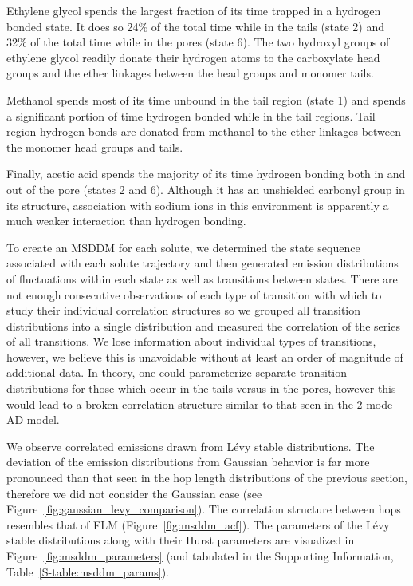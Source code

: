 \documentclass{article}
\begin{document}
  Ethylene glycol spends the largest fraction of its time trapped in a hydrogen
  bonded state. It does so 24\% of the total time while in the tails (state 2)
  and 32\% of the total time while in the pores (state 6). The two hydroxyl groups 
  of ethylene glycol readily donate their hydrogen atoms to the carboxylate
  head groups and the ether linkages between the head groups and monomer tails. 
  
  Methanol spends most of its time unbound in the tail region (state 1) and spends a 
  significant portion of time hydrogen bonded while in the tail regions.
  Tail region hydrogen bonds are donated from methanol to the ether linkages between
  the monomer head groups and tails.
  
  Finally, acetic acid spends the majority of its time hydrogen bonding both in and out
  of the pore (states 2 and 6). Although it has an unshielded carbonyl group in its
  structure, association with sodium ions in this environment is apparently a much 
  weaker interaction than hydrogen bonding.
  
  To create an MSDDM for each solute, we determined the state sequence associated
  with each solute trajectory and then generated emission distributions of fluctuations
  within each state as well as transitions between states. There are not enough 
  consecutive observations of each type of transition with which to study their 
  individual correlation structures so we grouped all transition distributions
  into a single distribution and measured the correlation of the series of all 
  transitions. 
  We lose information about individual types of transitions, however, 
  we believe this is unavoidable without at least an order of magnitude of additional data.
  In theory, one could parameterize separate transition distributions for those
  which occur in the tails versus in the pores, however this would lead to a broken 
  correlation structure similar to that seen in the 2 mode AD model.

  We observe correlated emissions drawn from L\'evy stable distributions. The 
  deviation of the emission distributions from Gaussian behavior is far more pronounced
  than that seen in the hop length distributions of the previous section, therefore we 
  did not consider the Gaussian case (see Figure~\ref{fig:gaussian_levy_comparison}).
  The correlation structure between hops resembles that of FLM (Figure~\ref{fig:msddm_acf}).
  The parameters of the L\'evy stable distributions along with their Hurst parameters 
  are visualized in Figure~\ref{fig:msddm_parameters} (and tabulated in the Supporting
  Information, Table~\ref{S-table:msddm_params}). 
  
\end{document}
